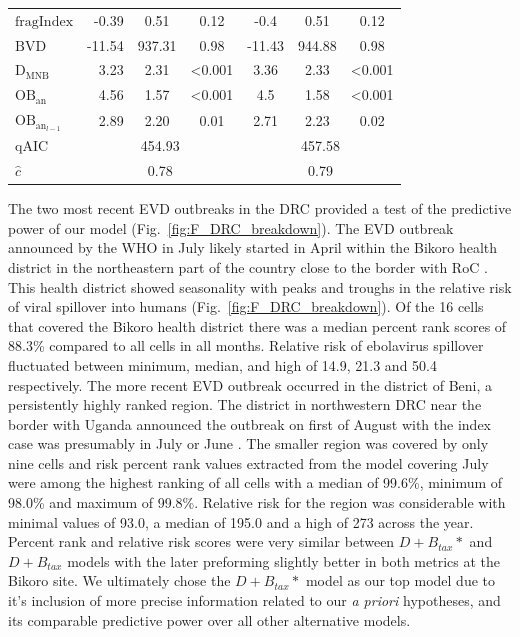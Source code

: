 \documentclass[a4paper,twoside, onecolumn]{article}
\newcommand{\Div}{\mathrm{D}}
\begin{document}
\begin{table}[h!]
\begin{tabular}{lcccccc}
		$\mathrm{fragIndex}$ & \multicolumn{1}{r}{-0.39} & 0.51 & 0.12 & -0.4 & 0.51 & 0.12 \\
		$\mathrm{BVD}$  & \multicolumn{1}{r}{-11.54} & 937.31 & 0.98 & -11.43 & 944.88 & 0.98 \\
		$\Div_{\mathrm{MNB}}$ & \multicolumn{1}{r}{3.23} & 2.31 & <0.001 & 3.36 & 2.33 & <0.001 \\
		$\mathrm{OB}_{\mathrm{an}}$ & \multicolumn{1}{r}{4.56} & 1.57 & <0.001 & 4.5 & 1.58 & <0.001 \\
		$\mathrm{OB}_{\mathrm{an}_{l-1}}$ & \multicolumn{1}{r}{2.89} & 2.20 & 0.01 & 2.71 & 2.23 & 0.02 \\
		\hline
		qAIC  & \multicolumn{3}{c}{454.93} & \multicolumn{3}{c}{457.58} \\
		$\hat{c}$ & \multicolumn{3}{c}{0.78} & \multicolumn{3}{c}{0.79} \\
	\end{tabular}%
\end{table}

	The two most recent EVD outbreaks in the DRC provided a test of the predictive power of our model (Fig.~\ref{fig:F_DRC_breakdown}). The EVD outbreak announced by the WHO in July likely started in April within the Bikoro health district in the northeastern part of the country close to the border with RoC \cite{Barry2018}. This health district showed seasonality with peaks and troughs in the relative risk of viral spillover into humans (Fig.~\ref{fig:F_DRC_breakdown}). Of the 16 cells that covered the Bikoro health district there was a median percent rank scores of 88.3\% compared to all cells in all months. Relative risk of ebolavirus spillover fluctuated between minimum, median, and high of 14.9, 21.3 and 50.4 respectively. The more recent EVD outbreak occurred in the district of Beni, a persistently highly ranked region. The district in northwestern DRC near the border with Uganda announced the outbreak on first of August with the index case was presumably in July or June \cite{WHO2018}. The smaller region was covered by only nine cells and risk percent rank values extracted from the model covering July were among the highest ranking of all cells with a median of 99.6\%, minimum of 98.0\% and maximum of 99.8\%. Relative risk for the region was considerable with minimal values of 93.0, a median of 195.0 and a high of 273 across the year. Percent rank and relative risk scores were very similar between $D + B_{tax}*$ and  $D + B_{tax}$ models with the later preforming slightly better in both metrics at the Bikoro site. We ultimately chose the  $D + B_{tax}*$ model as our top model due to it's inclusion of more precise information related to our \textit{a priori} hypotheses, and its comparable predictive power over all other alternative models.
\end{document}
